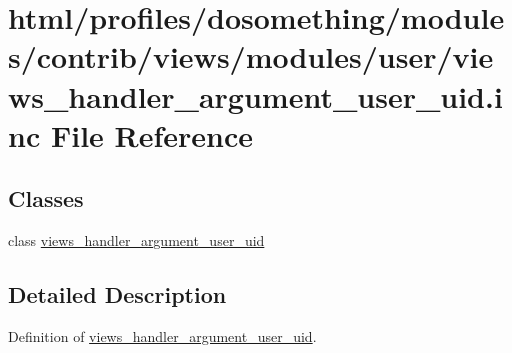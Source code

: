 \hypertarget{views__handler__argument__user__uid_8inc}{
\section{html/profiles/dosomething/modules/contrib/views/modules/user/views\_\-handler\_\-argument\_\-user\_\-uid.inc File Reference}
\label{views__handler__argument__user__uid_8inc}
}
\subsection*{Classes}
\begin{DoxyCompactItemize}
\item 
class \hyperlink{classviews__handler__argument__user__uid}{views\_\-handler\_\-argument\_\-user\_\-uid}
\end{DoxyCompactItemize}


\subsection{Detailed Description}
Definition of \hyperlink{classviews__handler__argument__user__uid}{views\_\-handler\_\-argument\_\-user\_\-uid}. 